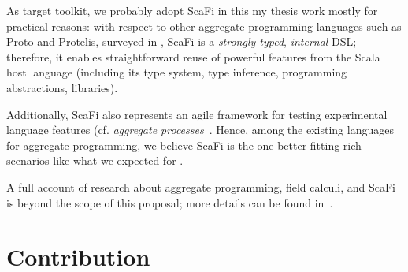 \documentclass[11pt]{article}
\begin{document}
As target toolkit, we probably adopt ScaFi in this my thesis work mostly for practical reasons: with respect to other aggregate programming languages such as Proto and Protelis, surveyed in \cite{viroli2019jlamp-si-coord},
ScaFi is a \emph{strongly typed}, \emph{internal} DSL; therefore, it enables straightforward reuse of powerful features from the Scala host language (including its type system, type inference, programming abstractions, libraries).

Additionally, ScaFi also represents an agile framework for testing experimental language features (cf. \emph{aggregate processes}~\cite{DBLP:journals/eaai/CasadeiVAPD21}.
%
Hence, among the existing languages for aggregate programming, we believe ScaFi is the one better fitting rich scenarios like what we expected for \cpws.

A full account of research about aggregate programming, field calculi, and ScaFi is beyond the scope of this proposal; more details can be found in~\cite{viroli2019jlamp-si-coord,DBLP:journals/eaai/CasadeiVAPD21}.

\section{Contribution} \label{contribution}
\end{document}
